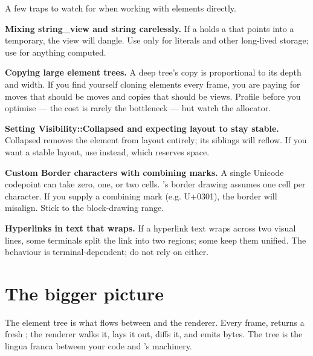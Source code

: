 A few traps to watch for when working with elements directly.

\begin{warning}
\textbf{Mixing string\_view and string carelessly.} If a
 holds a  that points
into a temporary, the view will dangle. Use 
only for literals and other long-lived storage; use
 for anything computed.
\end{warning}

\begin{warning}
\textbf{Copying large element trees.} A deep tree's copy is
proportional to its depth and width. If you find yourself
cloning elements every frame, you are paying for moves that
should be moves and copies that should be views. Profile
before you optimise --- the cost is rarely the bottleneck ---
but watch the allocator.
\end{warning}

\begin{warning}
\textbf{Setting Visibility::Collapsed and expecting layout to
stay stable.} Collapsed removes the element from layout
entirely; its siblings will reflow. If you want a stable layout,
use  instead, which reserves space.
\end{warning}

\begin{warning}
\textbf{Custom Border characters with combining marks.} A single
Unicode codepoint can take zero, one, or two cells. \maya{}'s
border drawing assumes one cell per character. If you supply a
combining mark (e.g. U+0301), the border will misalign. Stick to
the block-drawing range.
\end{warning}

\begin{warning}
\textbf{Hyperlinks in text that wraps.} If a hyperlink text
wraps across two visual lines, some terminals split the link
into two regions; some keep them unified. The behaviour is
terminal-dependent; do not rely on either.
\end{warning}

\section{The bigger picture}

The element tree is what flows between  and the
renderer. Every frame,  returns a fresh ;
the renderer walks it, lays it out, diffs it, and emits bytes.
The tree is the lingua franca between your code and \maya{}'s
machinery.

